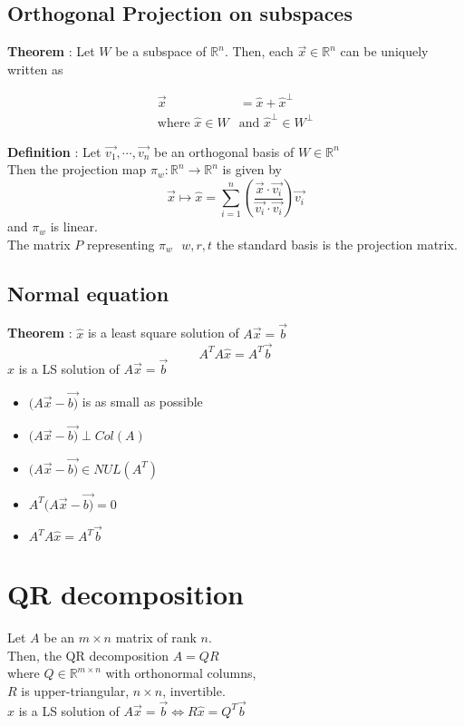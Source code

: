 \documentclass{article}
\begin{document}
\subsection{Orthogonal Projection on subspaces}
{
\textbf{Theorem} : 
Let $W$ be a subspace of $\mathbb{R}^n$. Then, each $\vec{x} \in \mathbb{R}^n$ can be uniquely written as

\begin{align*}
                        \vec{x} &= \hat{x} + \hat{x}^\perp              \\
    \text{where } \hat{x} \in W &\text{and } \hat{x}^\perp \in W^\perp
\end{align*}

\textbf{Definition} : 
Let $\vec{v_1}, \cdots , \vec{v_n}$ be an orthogonal basis of $W \in \mathbb{R}^n$ \\
Then the projection map $\pi_w : \mathbb{R}^n \rightarrow \mathbb{R}^n$ is given by
\[
\vec{x} \mapsto \hat{x} = \sum_{i=1}^{n} (\frac{\vec{x} \cdot \vec{v_i}}{\vec{v_i} \cdot \vec{v_i}})\vec{v_i}
\]
and $\pi_w$ is linear.\\
The matrix $P$ representing $\pi_w \text{  }w,r,t$ the standard basis is the projection matrix.

}

\subsection{Normal equation}
{
\textbf{Theorem} : 
$\hat{x}$ is a least square solution of $A\vec{x}=\vec{b}$
\[
A^TA\hat{x} = A^T\vec{b}
\]
$\hat{x}$ is a LS solution of  $A\vec{x}=\vec{b}$
\begin{itemize}
    \item $(A\vec{x} - \vec{b)}$ is as small as possible
    \item $(A\vec{x} - \vec{b)} \perp Col(A)$ 
    \item $(A\vec{x} - \vec{b)} \in NUL(A^T)$
    \item $A^T(A\vec{x} - \vec{b)} = 0$ 
    \item $A^TA\hat{x} = A^T\vec{b}$ 
\end{itemize}
}

\section{QR decomposition}
{
Let $A$ be an $m \times n$ matrix of rank $n$. \\
Then, the QR decomposition $A=QR$\\
where $Q \in \mathbb{R}^{m \times n}$ with orthonormal columns,\\
$R$ is upper-triangular, $n \times n$, invertible.\\

$\hat{x}$ is a LS solution of  $A\vec{x}=\vec{b} \Longleftrightarrow R\hat{x}=Q^T\vec{b}$
}
\end{document}
